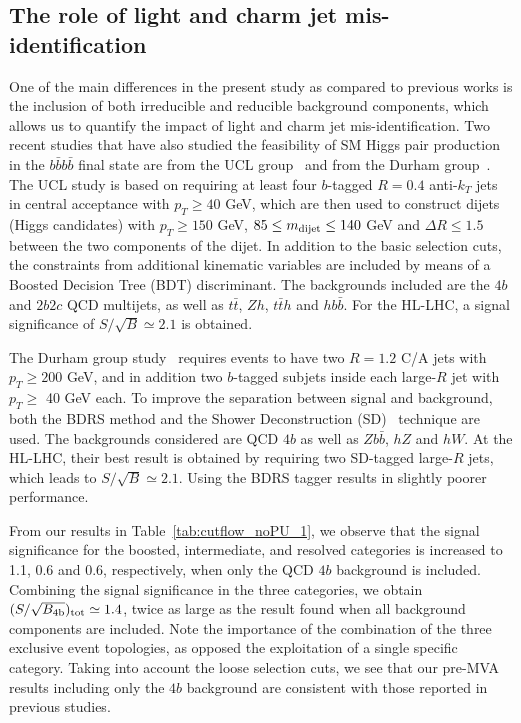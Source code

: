 \subsection{The role of light  and charm jet mis-identification}

One of the main differences in the present study as compared
to previous works is the inclusion of both irreducible
and reducible background components, which allows us to
quantify
the impact of light and charm jet mis-identification. 
%
Two recent studies that have also studied the
feasibility of SM Higgs pair production in the $b\bar{b}b\bar{b}$
final state are from the UCL group~\cite{Wardrope:2014kya} and from
the
Durham group~\cite{deLima:2014dta}.
%
The UCL study is based
on requiring at least four $b$-tagged $R=0.4$ anti-$k_T$ jets
in central acceptance with $p_T \ge 40$ GeV, which are
then used to construct dijets (Higgs candidates) with
$p_T \ge 150$ GeV, $85 \le m_{\rm dijet} \le 140$ GeV
and $\Delta R \le 1.5$ between the two components
of the dijet.
%
In addition to the basic selection cuts, the constraints
from additional kinematic variables are included by means of a 
Boosted Decision Tree (BDT) discriminant.
%
The backgrounds included are the $4b$ and
$2b2c$ QCD multijets, as well as
$t\bar{t}$, $Zh$, $t\bar{t}h$ and $hb\bar{b}$.
%
For the HL-LHC, a signal significance of $S/\sqrt{B}\simeq 2.1$ 
is obtained.

The Durham group study~\cite{deLima:2014dta} requires events
to have two $R=1.2$ C/A jets with $p_T\ge 200$ GeV, and in
addition
two $b$-tagged subjets inside each large-$R$ jet with
$p_T \ge$ 40 GeV each.
%
To improve the separation between
signal and background, both the BDRS
method and the Shower Deconstruction (SD)~\cite{Soper:2011cr,Soper:2012pb}
technique are used.
%
The backgrounds considered are QCD $4b$ as well as $Zb\bar{b}$, $hZ$ and
$hW$.
%
At the HL-LHC, their best result is obtained by requiring two
SD-tagged large-$R$ jets, which leads to $S/\sqrt{B}\simeq 2.1$.
%
Using the BDRS tagger
results in slightly poorer performance.
 
 From our results in Table~\ref{tab:cutflow_noPU_1}, we observe
 that the signal significance for the boosted, intermediate,
 and resolved categories is increased to 1.1, 0.6 and 0.6, respectively,
 when only the QCD $4b$ background is included.
 Combining
 the signal significance in the three categories,
 we
 obtain $(S/\sqrt{B_{\rm 4b}})_{\rm tot}\simeq 1.4$, twice
 as large as the result found when
 all background components are included.
 Note the importance of
 the combination of the three exclusive event topologies,
 as opposed the exploitation of a single specific category.
 Taking into account the loose selection cuts, we
 see that
 our pre-MVA results including only the $4b$ background are consistent
 with those reported in previous studies.

